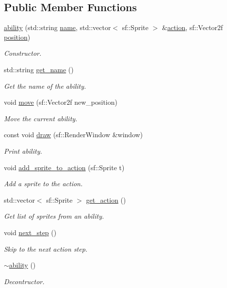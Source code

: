 \subsection*{Public Member Functions}
\begin{DoxyCompactItemize}
\item 
\hyperlink{classability_a467a2d8bf397119e9856d1cf8d2c58bc}{ability} (std\+::string \hyperlink{classability_a0064d2793f684924720a08b059ec2ee0}{name}, std\+::vector$<$ sf\+::\+Sprite $>$ \&\hyperlink{classaction}{action}, sf\+::\+Vector2f \hyperlink{classability_a36d5b1ac8a8a2df0f1790f3ddf320fad}{position})
\begin{DoxyCompactList}\small\item\em Constructor. \end{DoxyCompactList}\item 
std\+::string \hyperlink{classability_a83c4b418a33a2a7f44c3883abfeac4fb}{get\+\_\+name} ()
\begin{DoxyCompactList}\small\item\em Get the name of the ability. \end{DoxyCompactList}\item 
void \hyperlink{classability_ae34dc7ddb4b0fdb1b00e70ce1860456e}{move} (sf\+::\+Vector2f new\+\_\+position)
\begin{DoxyCompactList}\small\item\em Move the current ability. \end{DoxyCompactList}\item 
const void \hyperlink{classability_a5cc662aeebc530c01b7bd5ed9328a54e}{draw} (sf\+::\+Render\+Window \&window)
\begin{DoxyCompactList}\small\item\em Print ability. \end{DoxyCompactList}\item 
void \hyperlink{classability_a3c6429af67529f039161a35f70caca6f}{add\+\_\+sprite\+\_\+to\+\_\+action} (sf\+::\+Sprite t)
\begin{DoxyCompactList}\small\item\em Add a sprite to the action. \end{DoxyCompactList}\item 
std\+::vector$<$ sf\+::\+Sprite $>$ \hyperlink{classability_adeb10a7af2d372637d56395792ac918f}{get\+\_\+action} ()
\begin{DoxyCompactList}\small\item\em Get list of sprites from an ability. \end{DoxyCompactList}\item 
void \hyperlink{classability_aed378a7d8a69e8a50347bcc03c0cffb3}{next\+\_\+step} ()
\begin{DoxyCompactList}\small\item\em Skip to the next action step. \end{DoxyCompactList}\item 
\hyperlink{classability_a6eedfacfa97cb7195dee8e9c0cccb54d}{$\sim$ability} ()
\begin{DoxyCompactList}\small\item\em Decontructor. \end{DoxyCompactList}\end{DoxyCompactItemize}
